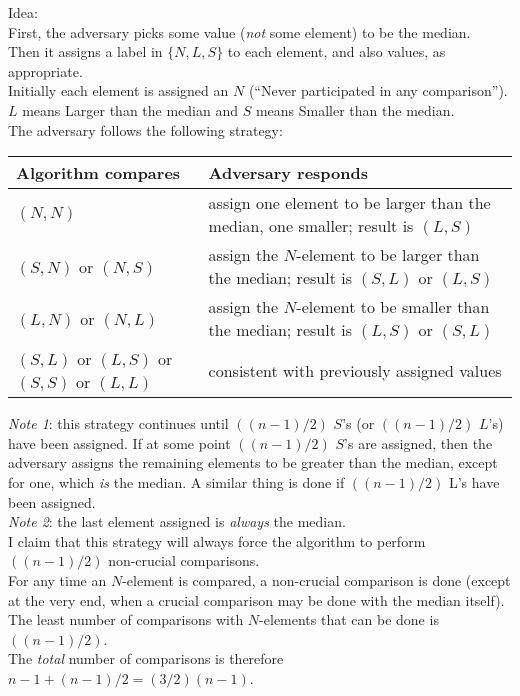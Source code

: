 \documentclass[12pt]{article}
\theoremstyle{plain}
\theoremstyle{definition}
\begin{document}
Idea: \\
First, the adversary picks some value (\emph{not} some element) to be the median. \\
Then it assigns a label in $\{N, L, S\}$ to each element, and also values, as appropriate. \\
Initially each element is assigned an $N$ (``Never participated in any comparison'').
$L$ means Larger than the median and $S$ means Smaller than the median. \\
The adversary follows the following strategy:
\begin{table}[H]
  \label{tab:ad_median_strat}
  \centering
  \begin{tabular}{L{4cm}|L{8cm}}
  \hline
  Algorithm compares & Adversary responds \\ \hline \hline
  $(N, N)$ & assign one element to be larger than the median, one smaller; result is $(L, S)$ \\ \hline
  $(S, N)$ or $(N, S)$ & assign the $N$-element to be larger than the median; result is $(S, L)$ or $(L, S)$ \\ \hline
  $(L, N)$ or $(N, L)$ & assign the $N$-element to be smaller than the median; result is $(L, S)$ or $(S, L)$ \\ \hline
  $(S, L)$ or $(L, S)$ or $(S, S)$ or $(L, L)$ & consistent with previously assigned values \\ \hline
  \end{tabular}
\end{table}
\emph{Note 1}: this strategy continues until $((n - 1)/2)$ $S$'s (or $((n - 1)/2)$ $L$'s) have been assigned.
If at some point $((n - 1)/2)$ $S$'s are assigned, then the adversary assigns the remaining elements to be greater than the median, except for one, which \emph{is} the median.
A similar thing is done if $((n - 1)/2)$ L's have been assigned. \\

\emph{Note 2}: the last element assigned is \emph{always} the median. \\

I claim that this strategy will always force the algorithm to perform $((n - 1)/2)$ non-crucial comparisons. \\
For any time an $N$-element is compared, a non-crucial comparison is done (except at the very end, when a crucial comparison may be done with the median itself). \\
The least number of comparisons with $N$-elements that can be done is $((n - 1)/2)$. \\
The \emph{total} number of comparisons is therefore $n - 1 + (n - 1)/2 = (3/2)(n - 1)$.
\end{document}
